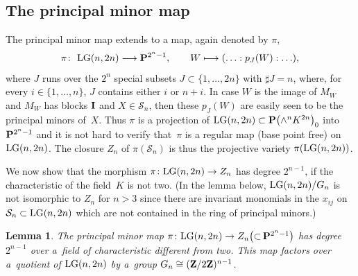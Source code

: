 \documentclass[10pt,a4paper]{amsart}
\newcommand{\ZZ}{{\bf Z}}
\newcommand{\PP}{{\bf P}}
\newcommand{\cS}{{\cal S}}
\numberwithin{equation}{section}
\newtheorem{Lemma}[Theorem]{Lemma}
\providecommand{\cal}{\mathcal}
\begin{document}
\subsection{The principal minor map}\label{pmm}
The principal minor map extends to a map, again denoted by $\pi$,
\begin{gather*}
\pi\colon \ {\rm LG}(n,2n) \longrightarrow \PP^{2^n-1},\qquad W \longmapsto (\ldots:p_J(W):\ldots),
\end{gather*}
where $J$ runs over the $2^n$ special subsets $J\subset\{1,\ldots,2n\}$ with $\sharp J=n$, where, for every $i\in \{1,\ldots,n\}$, $J$ contains either $i$ or $n+i$. In case $W$ is the image of $M_W$ and $M_W$ has blocks ${\bf I}$ and $X\in\cS_n$, then these $p_J(W)$ are easily seen to be the principal minors of~$X$. Thus $\pi$ is a projection
of ${\rm LG}(n,2n)\subset \PP\big({\wedge}^nK^{2n}\big)_0$ into $\PP^{2^n-1}$ and it is not hard to verify that~$\pi$ is a regular map (base point free) on ${\rm LG}(n,2n)$. The closure $Z_n$ of $\pi(\cS_n)$ is thus the projective variety $\pi({\rm LG}(n,2n))$.

We now show that the morphism $\pi\colon {\rm LG}(n,2n)\rightarrow Z_n$ has degree $2^{n-1}$, if the characteristic of the field~$K$ is not two. (In the lemma below, ${\rm LG}(n,2n)/G_n$ is not isomorphic to $Z_n$ for $n>3$ since there are invariant monomials in the $x_{ij}$ on $\cS_n\subset {\rm LG}(n,2n)$ which are not contained in the ring of principal minors.)

\begin{Lemma}The principal minor map $\pi\colon {\rm LG}(n,2n)\rightarrow Z_n \big({\subset}\,\PP^{2^n-1}\big)$ has degree $2^{n-1}$ over a~field of characteristic different from two. This map factors over a~quotient of ${\rm LG}(n,2n)$ by a~group $G_n\cong (\ZZ/2\ZZ)^{n-1}$.
\end{Lemma}
\end{document}
